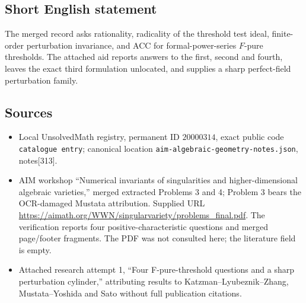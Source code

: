 \documentclass[11pt]{article}
\begin{document}
\subsection{Short English statement}
The merged record asks rationality, radicality of the threshold test ideal, finite-order perturbation invariance, and ACC for formal-power-series \(F\)-pure thresholds. The attached aid reports answers to the first, second and fourth, leaves the exact third formulation unlocated, and supplies a sharp perfect-field perturbation family.
\subsection{Sources}
\begin{itemize}
\item Local UnsolvedMath registry, permanent ID \(20000314\), exact public code \texttt{catalogue entry}; canonical location \texttt{aim-algebraic-geometry-notes.json}, notes[313].
\item AIM workshop ``Numerical invariants of singularities and higher-dimensional algebraic varieties,'' merged extracted Problems 3 and 4; Problem 3 bears the OCR-damaged Mustata attribution. Supplied URL \url{https://aimath.org/WWN/singularvariety/problems_final.pdf}. The verification reports four positive-characteristic questions and merged page/footer fragments. The PDF was not consulted here; the literature field is empty.
\item Attached research attempt 1, ``Four F-pure-threshold questions and a sharp perturbation cylinder,'' attributing results to Katzman--Lyubeznik--Zhang, Mustata--Yoshida and Sato without full publication citations.
\end{itemize}
\end{document}
